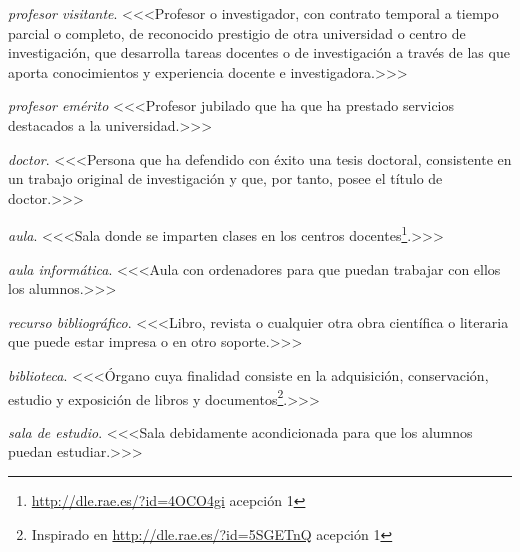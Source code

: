    \item \emph{profesor visitante}. <<<Profesor o investigador, con contrato temporal a tiempo parcial o completo, de reconocido prestigio de otra universidad o centro de investigación, que desarrolla tareas docentes o de investigación a través de las que aporta conocimientos y experiencia docente e investigadora\cite[artículo 54]{leyUniversidades}.>>>

    \item \emph{profesor emérito} <<<Profesor jubilado que ha que ha prestado servicios destacados a la universidad\cite[artículo 54bis]{leyUniversidades}.>>>

    \item \emph{doctor}. <<<Persona que ha defendido con éxito una tesis doctoral, consistente en un trabajo original de investigación y que, por tanto, posee el título de doctor.>>>

    \item \emph{aula}. <<<Sala donde se imparten clases en los centros docentes\footnote{\url{http://dle.rae.es/?id=4OCO4gi} acepción 1}.>>>

    \item \emph{aula informática}. <<<Aula con ordenadores para que puedan trabajar con ellos los alumnos.>>>

    \item \emph{recurso bibliográfico}. <<<Libro, revista o cualquier otra obra científica o literaria que puede estar impresa o en otro soporte.>>>

    \item \emph{biblioteca}. <<<Órgano cuya finalidad consiste en la adquisición, conservación, estudio y exposición de libros y documentos\footnote{Inspirado en \url{http://dle.rae.es/?id=5SGETnQ} acepción 1}.>>>

    \item \emph{sala de estudio}. <<<Sala debidamente acondicionada para que los alumnos puedan estudiar.>>> 

{}

